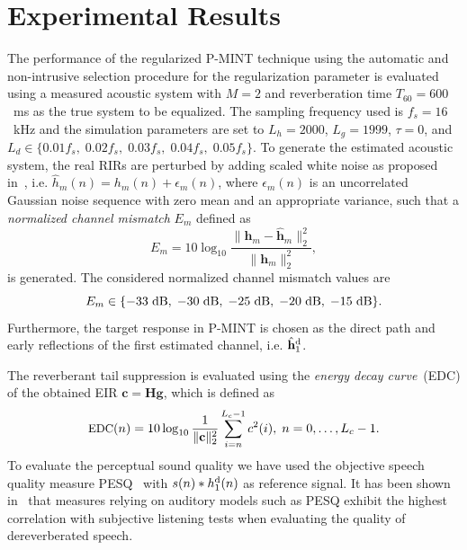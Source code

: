 \documentclass{article}
\begin{document}
\section{Experimental Results}
\label{sec: exp}
The performance of the regularized P-MINT technique using the automatic and non-intrusive selection procedure for the regularization parameter is evaluated using a measured acoustic system with $M=2$ and reverberation time $T_{60} = 600$~ms as the true system to be equalized. 
The sampling frequency used is $f_s = 16$~kHz and the simulation parameters are set to $L_h = 2000$, $L_g = 1999$, $\tau = 0$, and $L_d \in \{0.01 f_s, \; 0.02f_s, \; 0.03f_s, \; 0.04f_s, \; 0.05f_s\}$.
To generate the estimated acoustic system, the real RIRs are perturbed by adding scaled white noise as proposed in~\cite{Cho_ITSA_1999}, i.e. $\hat{h}_m(n) = h_m(n) + \epsilon_m(n)$, where $\epsilon_m(n)$ is an uncorrelated Gaussian noise sequence with zero mean and an appropriate variance, such that a \emph{normalized channel mismatch} $E_m$ defined as
\begin{equation}
E_m = 10 \log_{10} \frac{\|\mathbf{h}_m - \hat{\mathbf{h}}_m \|_2^2}{\|\mathbf{h}_m\|_2^2},
\end{equation}
is generated. 
The considered normalized channel mismatch values are 
\begin{equation}
\small
E_m \in \{ -33~{\rm dB}, \; -30~{\rm dB}, \; -25~{\rm dB}, \; -20~{\rm dB}, \; -15~{\rm dB} \}.
\end{equation}
Furthermore, the target response in P-MINT is chosen as the direct path and early reflections of the first estimated channel, i.e. $\hat{\mathbf{h}}_1^{\rm d}$.

The reverberant tail suppression is evaluated using the \emph{energy decay curve}~(EDC) of the obtained EIR $\mathbf{c} = \mathbf{H} \mathbf{g}$, which is defined as
\begin{equation}
\small
\hbox{EDC}(n) = 10 \log_{10}\frac{1}{\|\mathbf{c}\|_2^2}\sum_{i=n}^{L_c-1}c^2(i), \; n = 0,  \ldots,  L_c-1.
\end{equation}
To evaluate the perceptual sound quality we have used the objective speech quality measure PESQ~\cite{PESQ} with $s(n) \ast h_1^{\rm d}(n)$ as reference signal.
It has been shown in~\cite{Goetze_AES_2010} that measures relying on auditory models such as PESQ exhibit the highest correlation with subjective listening tests when evaluating the quality of dereverberated speech.
\end{document}
